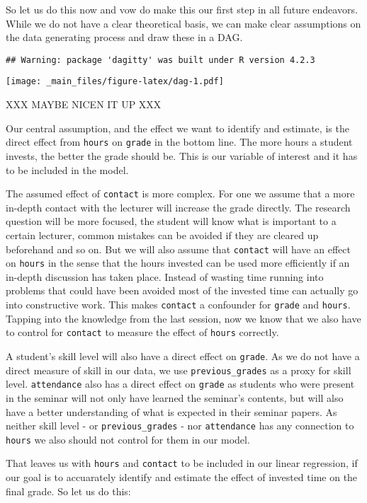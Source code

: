 \documentclass[
]{book}
\begin{document}
So let us do this now and vow do make this our first step in all future
endeavors. While we do not have a clear theoretical basis, we can make clear
assumptions on the data generating process and draw these in a DAG.

\begin{verbatim}
## Warning: package 'dagitty' was built under R version 4.2.3
\end{verbatim}

\texttt{[image: \_main\_files/figure-latex/dag-1.pdf]}

XXX MAYBE NICEN IT UP XXX

Our central assumption, and the effect we want to identify and estimate, is the
direct effect from \texttt{hours} on \texttt{grade} in the bottom line. The more hours a
student invests, the better the grade should be. This is our variable of
interest and it has to be included in the model.

The assumed effect of \texttt{contact} is more complex. For one we assume that a more
in-depth contact with the lecturer will increase the grade directly. The
research question will be more focused, the student will know what is important
to a certain lecturer, common mistakes can be avoided if they are cleared up
beforehand and so on. But we will also assume that \texttt{contact} will have an effect
on \texttt{hours} in the sense that the hours invested can be used more efficiently if
an in-depth discussion has taken place. Instead of wasting time running into
problems that could have been avoided most of the invested time can actually go
into constructive work. This makes \texttt{contact} a confounder for \texttt{grade} and
\texttt{hours}. Tapping into the knowledge from the last session, now we know that we
also have to control for \texttt{contact} to measure the effect of \texttt{hours} correctly.

A student's skill level will also have a direct effect on \texttt{grade}. As we do not
have a direct measure of skill in our data, we use \texttt{previous\_grades} as a proxy
for skill level. \texttt{attendance} also has a direct effect on \texttt{grade} as students
who were present in the seminar will not only have learned the seminar's
contents, but will also have a better understanding of what is expected in their
seminar papers. As neither skill level - or \texttt{previous\_grades} - nor \texttt{attendance}
has any connection to \texttt{hours} we also should not control for them in our model.

That leaves us with \texttt{hours} and \texttt{contact} to be included in our linear
regression, if our goal is to accuarately identify and estimate the effect of
invested time on the final grade. So let us do this:
\end{document}
